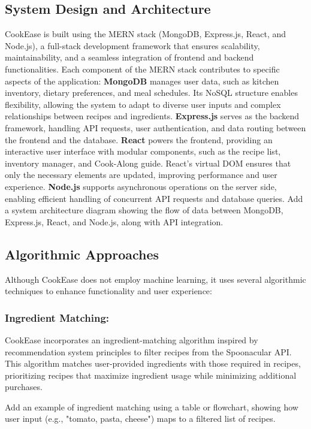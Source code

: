 \documentclass[10pt,twocolumn]{article}
\begin{document}
\subsection{System Design and Architecture}
CookEase is built using the MERN stack (MongoDB, Express.js, React, and Node.js), a full-stack development framework that ensures scalability, maintainability, and a seamless integration of frontend and backend functionalities. Each component of the MERN stack contributes to specific aspects of the application:
\textbf{MongoDB} manages user data, such as kitchen inventory, dietary preferences, and meal schedules. Its NoSQL structure enables flexibility, allowing the system to adapt to diverse user inputs and complex relationships between recipes and ingredients.
\textbf{Express.js} serves as the backend framework, handling API requests, user authentication, and data routing between the frontend and the database.
\textbf{React} powers the frontend, providing an interactive user interface with modular components, such as the recipe list, inventory manager, and Cook-Along guide. React's virtual DOM ensures that only the necessary elements are updated, improving performance and user experience.
\textbf{Node.js} supports asynchronous operations on the server side, enabling efficient handling of concurrent API requests and database queries.
Add a system architecture diagram showing the flow of data between MongoDB, Express.js, React, and Node.js, along with API integration.

\subsection{Algorithmic Approaches}
Although CookEase does not employ machine learning, it uses several algorithmic techniques to enhance functionality and user experience:

\subsubsection{Ingredient Matching:}
CookEase incorporates an ingredient-matching algorithm inspired by recommendation system principles to filter recipes from the Spoonacular API. This algorithm matches user-provided ingredients with those required in recipes, prioritizing recipes that maximize ingredient usage while minimizing additional purchases.

Add an example of ingredient matching using a table or flowchart, showing how user input (e.g., "tomato, pasta, cheese") maps to a filtered list of recipes.
\end{document}
